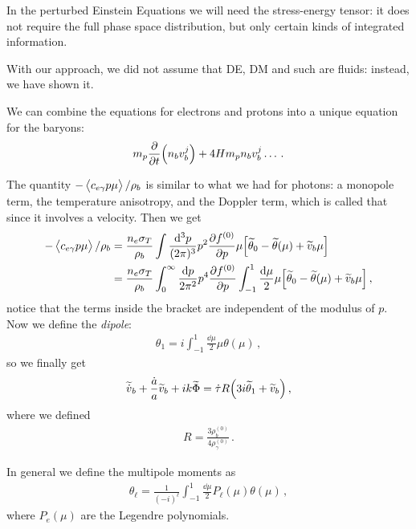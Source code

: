 \documentclass[main.tex]{subfiles}
\begin{document}

In the perturbed Einstein Equations we will need the stress-energy tensor: it does not require the full phase space distribution, but only certain kinds of integrated information. 

With our approach, we did not assume that DE, DM and such are fluids: instead, we have shown it. 

We can combine the equations for electrons and protons into a unique equation for the baryons: 
%
\begin{align}
m_p \pdv{}{t} \qty(n_b v_b^{j}) + 4H m_p n_b v_b^{j} \dots
\,.
\end{align}
%

The quantity \(- \expval{c_{e \gamma } p \mu } / \rho_{b}\) is similar to what we had for photons: a monopole term, the temperature anisotropy, and the Doppler term, which is called that since it involves a velocity. Then we get 
%
\begin{align}
- \expval{c_{e \gamma } p \mu } / \rho_{b}
&= \frac{n_e \sigma_{T}}{\rho_{b}}
\int \frac{ \dd[3]{p}}{(2 \pi )^3} p^2 \pdv{f^{(0)}}{p} \mu \qty[ \widetilde{\theta}_{0} - \widetilde{\theta} (\mu ) + \widetilde{v}_{b} \mu ]  \\
&= \frac{n_e \sigma_{T}}{\rho_{b}}
\int_{0}^{ \infty } \frac{ \dd{p}}{2 \pi^2} p^{4} \pdv{f^{(0)}}{p} \int_{-1}^{1} \frac{ \dd{\mu }}{2} \mu \qty[\widetilde{\theta}_{0} - \widetilde{\theta} (\mu ) + \widetilde{v}_{b} \mu ] 
\,,
\end{align}
%
notice that the terms inside the bracket are independent of the modulus of \(p\). 
Now we define the \emph{dipole}: 
%
\begin{align}
\theta_{1} = i \int_{-1}^{1} \frac{ \dd{\mu }}{2 } \mu \theta(\mu )
\,,
\end{align}
%
so we finally get 
%
\begin{align}
\widetilde{\dot{v}}_{b} + \frac{\dot{a}}{a} \widetilde{v}_{b}
+ i k \widetilde{\Phi} =
\dot{\tau} R \qty(3 i \widetilde{\theta}_{1} + \widetilde{v}_{b})
\,,
\end{align}
%
where we defined 
%
\begin{align}
R = \frac{3 \rho_b^{(0)}}{4 \rho_{\gamma }^{(0)}}
\,.
\end{align}

In general we define the multipole moments as 
%
\begin{align}
\theta_{\ell} = \frac{1}{(-i)^{\ell}} \int_{-1}^{1} \frac{ \dd{\mu }}{2} P_\ell (\mu ) \theta(\mu )
\,,
\end{align}
%
where \(P_e (\mu )\) are the Legendre polynomials. 
\end{document}
